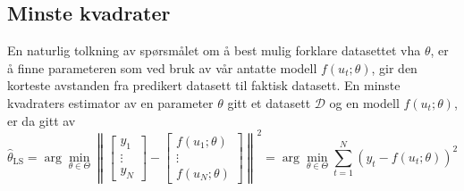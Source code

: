 \subsection{Minste kvadrater}
\label{sec:minste_kvadrater}
En naturlig tolkning av spørsmålet om å best mulig forklare datasettet vha $\theta$, er å finne parameteren som ved bruk av vår antatte modell $f(u_t; \theta)$, gir den korteste avstanden fra predikert datasett til faktisk datasett. En minste kvadraters estimator av en parameter $\theta$ gitt et datasett $\mathcal{D}$ og en modell $f(u_t; \theta)$, er da gitt av
\begin{equation}
\widehat{\theta}_{\mathrm{LS}}=\arg \min _{\theta \in \Theta}\left\|\left[\begin{array}{c}
{y_{1}} \\
{\vdots} \\
{y_{N}}
\end{array}\right]-\left[\begin{array}{c}
{f\left(u_{1} ; \theta\right)} \\
{\vdots} \\
{f\left(u_{N} ; \theta\right)}
\end{array}\right]\right\|^{2}=\arg \min _{\theta \in \Theta} \sum_{t=1}^{N}\left(y_{t}-f\left(u_{t} ; \theta\right)\right)^{2}
\end{equation}

